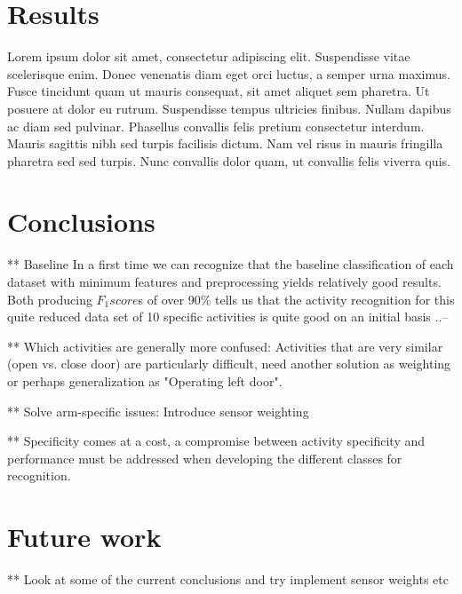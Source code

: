 \documentclass{sig-alternate}
\begin{document}
\section{Results}
Lorem ipsum dolor sit amet, consectetur adipiscing elit. Suspendisse vitae scelerisque enim. Donec venenatis diam eget orci luctus, a semper urna maximus. Fusce tincidunt quam ut mauris consequat, sit amet aliquet sem pharetra. Ut posuere at dolor eu rutrum. Suspendisse tempus ultricies finibus. Nullam dapibus ac diam sed pulvinar. Phasellus convallis felis pretium consectetur interdum. Mauris sagittis nibh sed turpis facilisis dictum. Nam vel risus in mauris fringilla pharetra sed sed turpis. Nunc convallis dolor quam, ut convallis felis viverra quis.


\section{Conclusions}
** Baseline
In a first time we can recognize that the baseline classification of each dataset with minimum features and preprocessing yields relatively good results. Both producing $F_1 score$s of over 90\% tells us that the activity recognition for this quite reduced data set of 10 specific activities is quite good on an initial basis ..--

** Which activities are generally more confused:
Activities that are very similar (open vs. close door) are particularly difficult, need another solution as weighting or perhaps generalization as "Operating left door".

** Solve arm-specific issues: Introduce sensor weighting

** Specificity comes at a cost, a compromise between activity specificity and performance must be addressed when developing the different classes for recognition.


\section{Future work}

** Look at some of the current conclusions and try implement sensor weights etc


\end{document}
